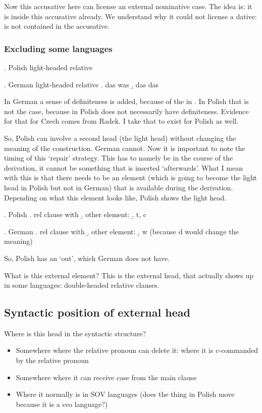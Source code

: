 Now this accusative here can license an external nominative case. The idea is: it is inside this accusative already. We understand why it could not license a dative:  is not contained in the accusative.


\subsubsection{Excluding some languages}

\ex. Polish light-headed relative

\ex. German light-headed relative
\a. das was
\b. das das

In German a sense of definiteness is added, because of the  in . In Polish that is not the case, because  in Polish does not necessarily have definiteness. Evidence for that for Czech comes from Radek. I take that to exist for Polish as well.

So, Polish can involve a second head (the light head) without changing the meaning of the construction. German cannot. Now it is important to note the timing of this `repair' strategy. This has to namely be in the course of the derivation, it cannot be something that is inserted `afterwards'. What I mean with this is that there needs to be an element (which is going to become the light head in Polish but not in German) that is available during the derivation. Depending on what this element looks like, Polish shows the light head.

\ex. Polish
\a. rel clause with 
\b. other element: 
\b. t, c

\ex. German
\a. rel clause with 
\b. other element: 
\b. w (because d would change the meaning)

So, Polish has an `out', which German does not have.

What is this external element? This is the external head, that actually shows up in some languages: double-headed relative clauses.



\subsection{Syntactic position of external head}

Where is this head in the syntactic structure?

  \begin{itemize}
    \item Somewhere where the relative pronoun can delete it: where it is c-commanded by the relative pronoun
    \item Somewhere where it can receive case from the main clause
    \item Where it normally is in SOV languages (does the thing in Polish move because it is a svo language?)
  \end{itemize}


